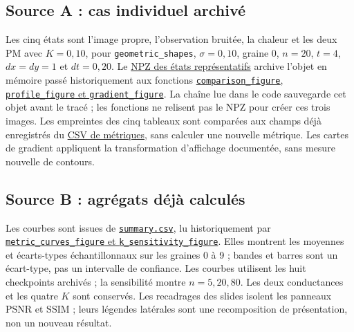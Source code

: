 \subsection*{Source A : cas individuel archivé}
Les cinq états sont l'image propre, l'observation bruitée, la chaleur et les
deux PM avec $K=0{,}10$, pour \texttt{geometric\_shapes}, $\sigma=0{,}10$,
graine 0, $n=20$, $t=4$, $dx=dy=1$ et $dt=0{,}20$.
Le \href{https://github.com/halhoulmhamed-droid/pde-image-denoising/blob/ae03109cdb2150b760e5a4b8bcffb56bba1b98e0/results/extended/arrays/representative_outputs.npz}{NPZ des états représentatifs}
archive l'objet en mémoire passé historiquement aux fonctions
\href{https://github.com/halhoulmhamed-droid/pde-image-denoising/blob/ae03109cdb2150b760e5a4b8bcffb56bba1b98e0/src/pde_image_denoising/plotting.py}{\texttt{comparison\_figure}, \texttt{profile\_figure} et \texttt{gradient\_figure}}.
La chaîne lue dans le code sauvegarde cet objet avant le tracé ; les fonctions
ne relisent pas le NPZ pour créer ces trois images. Les empreintes des cinq
tableaux sont comparées aux champs déjà enregistrés du
\href{https://github.com/halhoulmhamed-droid/pde-image-denoising/blob/ae03109cdb2150b760e5a4b8bcffb56bba1b98e0/results/extended/metrics.csv}{CSV de métriques},
sans calculer une nouvelle métrique. Les cartes de gradient appliquent la
transformation d'affichage documentée, sans mesure nouvelle de contours.

\subsection*{Source B : agrégats déjà calculés}
Les courbes sont issues de
\href{https://github.com/halhoulmhamed-droid/pde-image-denoising/blob/ae03109cdb2150b760e5a4b8bcffb56bba1b98e0/results/extended/summary.csv}{\texttt{summary.csv}},
lu historiquement par
\href{https://github.com/halhoulmhamed-droid/pde-image-denoising/blob/ae03109cdb2150b760e5a4b8bcffb56bba1b98e0/src/pde_image_denoising/extended_analysis.py}{\texttt{metric\_curves\_figure} et \texttt{k\_sensitivity\_figure}}.
Elles montrent les moyennes et écarts-types échantillonnaux sur les graines
0 à 9 ; bandes et barres sont un écart-type, pas un intervalle de confiance.
Les courbes utilisent les huit checkpoints archivés ; la sensibilité montre
$n=5,20,80$. Les deux conductances et les quatre $K$ sont conservés.
Les recadrages des slides isolent les panneaux PSNR et SSIM ; leurs légendes
latérales sont une recomposition de présentation, non un nouveau résultat.

